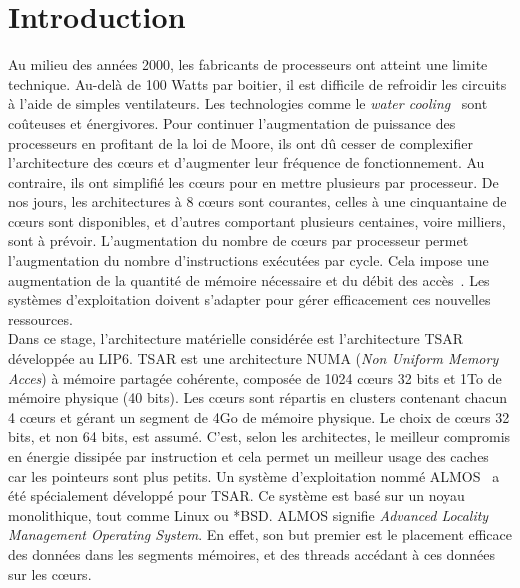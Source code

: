 \chapter{Introduction}

  \hspace{1cm}Au milieu des années 2000, les fabricants de processeurs ont
  atteint une limite technique.  Au-delà de 100 Watts par boitier, il est
  difficile de refroidir les circuits à l'aide de simples ventilateurs. Les
  technologies comme le \textit{water cooling}~\citep{googleXXXXdatacenters}
  sont coûteuses et énergivores.  Pour continuer l'augmentation de puissance des
  processeurs en profitant de la loi de Moore, ils ont dû cesser de complexifier
  l'architecture des c\oe urs et d'augmenter leur fréquence de
  fonctionnement. Au contraire, ils ont simplifié les c\oe urs pour en mettre
  plusieurs par processeur.  De nos jours, les architectures à 8 c\oe urs sont
  courantes, celles à une cinquantaine de c\oe urs sont disponibles, et d'autres
  comportant plusieurs centaines, voire milliers, sont à prévoir.
  L'augmentation du nombre de c\oe urs par processeur permet l'augmentation du
  nombre d'instructions exécutées par cycle.  Cela impose une augmentation de la
  quantité de mémoire nécessaire et du débit des accès~\citep{hp2012z820,
    puget2013z9pe}. Les systèmes d'exploitation doivent s'adapter pour gérer
  efficacement ces nouvelles ressources.\\

  \hspace{1cm}Dans ce stage, l'architecture matérielle considérée est
  l'architecture TSAR~\citep{greiner2009tsar} développée au LIP6. TSAR est une
  architecture NUMA (\textit{Non Uniform Memory Acces}) à mémoire partagée
  cohérente, composée de 1024 c\oe urs 32 bits et 1To de mémoire physique (40
  bits).  Les c\oe urs sont répartis en clusters contenant chacun 4 c\oe urs et
  gérant un segment de 4Go de mémoire physique. Le choix de c\oe urs 32 bits, et
  non 64 bits, est assumé. C'est, selon les architectes, le meilleur compromis
  en énergie dissipée par instruction et cela permet un meilleur usage des
  caches car les pointeurs sont plus petits.  Un système d'exploitation nommé
  ALMOS~\citep{almaless2011almos} a été spécialement développé pour TSAR. Ce
  système est basé sur un noyau monolithique, tout comme Linux ou *BSD. ALMOS
  signifie \textit{Advanced Locality Management Operating System}. En effet, son
  but premier est le placement efficace des données dans les segments mémoires,
  et des threads accédant à ces données sur les c\oe urs.\\

